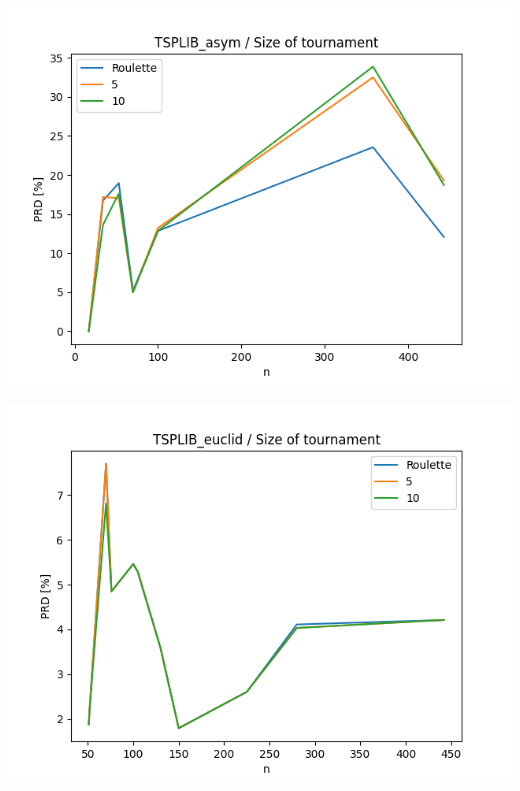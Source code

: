 \documentclass{article}
\begin{document}
\begin{center}
\includegraphics[width=\textwidth, 
                   height = 0.4\textheight, 
                   keepaspectratio]
                  {plots/tsplib_asym_7_tour} 
\end{center}

\begin{center}
\includegraphics[width=\textwidth, 
                   height = 0.4\textheight, 
                   keepaspectratio]
                  {plots/tsplib_euclid_7_tour} 
\end{center}
\end{document}
